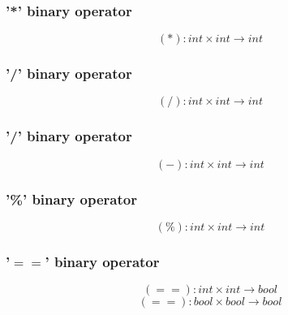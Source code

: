 \documentclass{article}
\begin{document}
\subsubsection{'*' binary operator}
$$
(*): int \times int \longrightarrow int
$$

\subsubsection{'/' binary operator}
$$
(/): int \times int \longrightarrow int
$$

\subsubsection{'/' binary operator}
$$
(-): int \times int \longrightarrow int
$$
\subsubsection{'\%' binary operator}
$$
(\%): int \times int \longrightarrow int
$$

\subsubsection{'$==$' binary operator}
$$
(==): int \times int \longrightarrow bool
$$
$$
(==): bool \times bool \longrightarrow bool
$$
\end{document}
